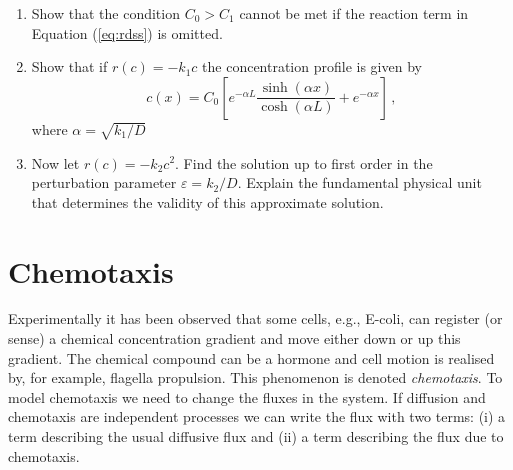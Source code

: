 \begin{exerciseregion}
\begin{exploration}
  \begin{enumerate}
  \item Show that the condition $C_0 > C_1$ cannot be met if the
    reaction term in Equation (\ref{eq:rdss}) is omitted. 
  \item Show that if $r(c)=-k_1c$ the concentration profile is given by
    \begin{equation}
      c(x) = C_0\left[
        e^{-\alpha L}\frac{\sinh(\alpha x)}{\cosh(\alpha L)} + e^{-\alpha x}
      \right] \, ,
    \end{equation}
    where $\alpha = \sqrt{k_1/D}$
  \item Now let $r(c)=-k_2c^2$. Find the solution up to first order in
    the perturbation parameter $\varepsilon = k_2/D$. Explain the
    fundamental physical unit that determines the validity of this
    approximate solution.
  \end{enumerate}
  \end{exploration}
\end{exerciseregion}

\section{Chemotaxis}
Experimentally it has been observed that some cells, e.g., E-coli, can
register (or sense) 
a chemical concentration gradient and move either down or up this gradient. 
The chemical compound can be a hormone and cell motion 
is realised by, for example, flagella propulsion. 
This phenomenon is denoted \emph{chemotaxis}. To model chemotaxis we need to
change the fluxes in the system. If diffusion and chemotaxis are independent processes we
can write the flux with two terms: (i) a term describing the usual diffusive flux 
and (ii) a term describing the flux due to chemotaxis. 

